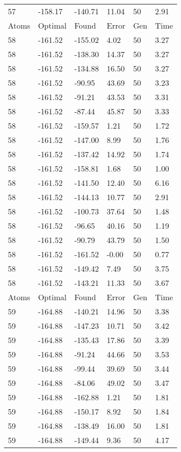 \documentclass{report}
\begin{document}
\begin{appendix}
\begin{longtable}{llllll}
57 & -158.17 & -140.71 & 11.04 & 50 & 2.91 \\
Atoms & Optimal & Found & Error & Gen & Time \\
58 & -161.52 & -155.02 & 4.02 & 50 & 3.27 \\
58 & -161.52 & -138.30 & 14.37 & 50 & 3.27 \\
58 & -161.52 & -134.88 & 16.50 & 50 & 3.27 \\
58 & -161.52 & -90.95 & 43.69 & 50 & 3.23 \\
58 & -161.52 & -91.21 & 43.53 & 50 & 3.31 \\
58 & -161.52 & -87.44 & 45.87 & 50 & 3.33 \\
58 & -161.52 & -159.57 & 1.21 & 50 & 1.72 \\
58 & -161.52 & -147.00 & 8.99 & 50 & 1.76 \\
58 & -161.52 & -137.42 & 14.92 & 50 & 1.74 \\
58 & -161.52 & -158.81 & 1.68 & 50 & 1.00 \\
58 & -161.52 & -141.50 & 12.40 & 50 & 6.16 \\
58 & -161.52 & -144.13 & 10.77 & 50 & 2.91 \\
58 & -161.52 & -100.73 & 37.64 & 50 & 1.48 \\
58 & -161.52 & -96.65 & 40.16 & 50 & 1.19 \\
58 & -161.52 & -90.79 & 43.79 & 50 & 1.50 \\
58 & -161.52 & -161.52 & -0.00 & 50 & 0.77 \\
58 & -161.52 & -149.42 & 7.49 & 50 & 3.75 \\
58 & -161.52 & -143.21 & 11.33 & 50 & 3.67 \\
Atoms & Optimal & Found & Error & Gen & Time \\
59 & -164.88 & -140.21 & 14.96 & 50 & 3.38 \\
59 & -164.88 & -147.23 & 10.71 & 50 & 3.42 \\
59 & -164.88 & -135.43 & 17.86 & 50 & 3.39 \\
59 & -164.88 & -91.24 & 44.66 & 50 & 3.53 \\
59 & -164.88 & -99.44 & 39.69 & 50 & 3.44 \\
59 & -164.88 & -84.06 & 49.02 & 50 & 3.47 \\
59 & -164.88 & -162.88 & 1.21 & 50 & 1.81 \\
59 & -164.88 & -150.17 & 8.92 & 50 & 1.84 \\
59 & -164.88 & -138.49 & 16.00 & 50 & 1.81 \\
59 & -164.88 & -149.44 & 9.36 & 50 & 4.17 \\

\end{longtable}
\end{appendix}
\end{document}
